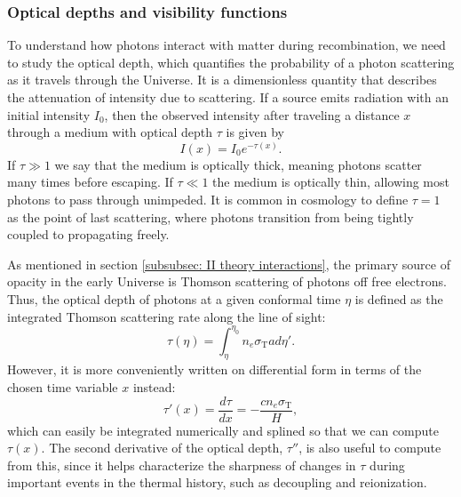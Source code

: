 \documentclass{aa}
\numberwithin{equation}{section}
\numberwithin{table}{section}
\numberwithin{figure}{section}
\begin{document}
\subsubsection{Optical depths and visibility functions}\label{subsubsec: II theory optical depth}

To understand how photons interact with matter during recombination, we need to study the optical depth, which quantifies the probability of a photon scattering as it travels through the Universe. 
It is a dimensionless quantity that describes the attenuation of intensity due to scattering. If a source emits radiation with an initial intensity $I_0$, then the observed intensity after traveling a distance $x$ through a medium with optical depth $\tau$ is given by
\begin{equation} 
  I(x) = I_0 e^{-\tau(x)}. 
\end{equation} 
If $\tau\gg1$ we say that the medium is optically thick, meaning photons scatter many times before escaping. If $\tau\ll1$ the medium is optically thin, allowing most photons to pass through unimpeded. It is common in cosmology to define $\tau=1$ as the point of last scattering, where photons transition from being tightly coupled to propagating freely.

As mentioned in section \ref{subsubsec: II theory interactions}, the primary source of opacity in the early Universe is Thomson scattering of photons off free electrons. Thus, the optical depth of photons at a given conformal time $\eta$ is defined as the integrated Thomson scattering rate along the line of sight:
\begin{equation}
  \tau(\eta) = \int_{\eta}^{\eta_0}n_e\sigma_\text{T}ad\eta'.
\end{equation}
However, it is more conveniently written on differential form in terms of the chosen time variable $x$ instead: 
\begin{equation}
  \tau'(x) = \frac{d\tau}{dx} = -\frac{c n_e \sigma_\text{T}}{H}, \label{eq: optical depth deriv}
\end{equation}
which can easily be integrated numerically and splined so that we can compute $\tau(x)$. The second derivative of the optical depth, $\tau''$, is also useful to compute from this, since it helps characterize the sharpness of changes in $\tau$ during important events in the thermal history, such as decoupling and reionization. 
\end{document}
